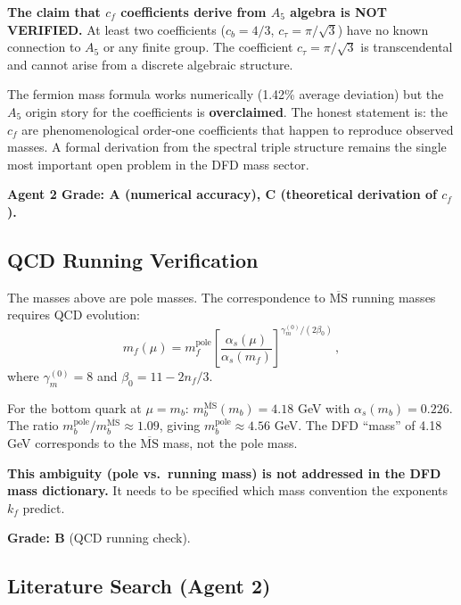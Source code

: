 \documentclass[11pt,a4paper]{article}
\begin{document}
\begin{tcolorbox}[colback=red!5!white, colframe=red!60!black, title={Agent 2 Critical Finding}]
\textbf{The claim that $c_f$ coefficients derive from $A_5$ algebra is NOT VERIFIED.} At least two coefficients ($c_b = 4/3$, $c_\tau = \pi/\sqrt{3}$) have no known connection to $A_5$ or any finite group. The coefficient $c_\tau = \pi/\sqrt{3}$ is transcendental and cannot arise from a discrete algebraic structure.

The fermion mass formula works numerically (1.42\% average deviation) but the $A_5$ origin story for the coefficients is \textbf{overclaimed}. The honest statement is: the $c_f$ are phenomenological order-one coefficients that happen to reproduce observed masses. A formal derivation from the spectral triple structure remains the single most important open problem in the DFD mass sector.
\end{tcolorbox}

\textbf{Agent 2 Grade: A (numerical accuracy), C (theoretical derivation of $c_f$).}

\subsection{QCD Running Verification}

The masses above are pole masses. The correspondence to $\overline{\mathrm{MS}}$ running masses requires QCD evolution:
\begin{equation}
m_f(\mu) = m_f^{\mathrm{pole}} \left[\frac{\alpha_s(\mu)}{\alpha_s(m_f)}\right]^{\gamma_m^{(0)}/(2\beta_0)}\,,
\end{equation}
where $\gamma_m^{(0)} = 8$ and $\beta_0 = 11 - 2n_f/3$.

For the bottom quark at $\mu = m_b$: $m_b^{\overline{\mathrm{MS}}}(m_b) = 4.18$ GeV with $\alpha_s(m_b) = 0.226$. The ratio $m_b^{\mathrm{pole}}/m_b^{\overline{\mathrm{MS}}} \approx 1.09$, giving $m_b^{\mathrm{pole}} \approx 4.56$ GeV. The DFD ``mass'' of 4.18 GeV corresponds to the $\overline{\mathrm{MS}}$ mass, not the pole mass.

\textbf{This ambiguity (pole vs.\ running mass) is not addressed in the DFD mass dictionary.} It needs to be specified which mass convention the exponents $k_f$ predict.

\textbf{Grade: B} (QCD running check).

\subsection{Literature Search (Agent 2)}
\end{document}
